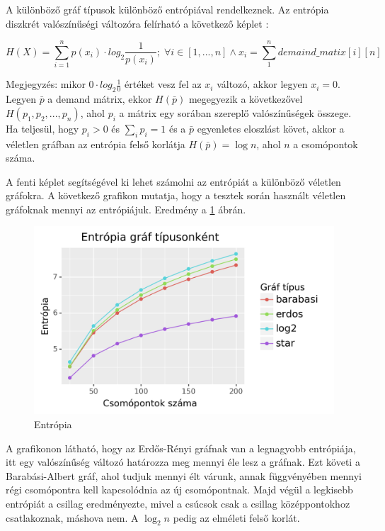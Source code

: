 \documentclass[12pt]{report}
\begin{document}
A különböző gráf típusok különböző entrópiával rendelkeznek.
Az entrópia diszkrét valószínűségi változóra felírható a következő képlet \cite{DBLP:journals/corr/AvinMS17}:  

\[H(X) = \sum_{i=1}^{n} p(x_i) \cdot log_2\frac{1}{p(x_i)}; \; \forall i\in[1, ..., n] \land x_i = \sum_{1}^{n} demaind\_matix[i][n]\] 

Megjegyzés: mikor \(0\cdot log_2\frac{1}{0}\) értéket vesz fel az \(x_i\) változó, akkor legyen \(x_i=0\). 
Legyen \(\bar{p}\) a demand mátrix, ekkor \(H(\bar{p})\) megegyezik a következővel \(H(p_1, p_2, ..., p_n)\), ahol \(p_i\) a mátrix egy sorában szereplő valószínűségek összege.
Ha teljesül, hogy \(p_i > 0\) és $\sum_{i}p_i = 1$ és a \(\bar{p}\) egyenletes eloszlást követ, akkor a véletlen gráfban az entrópia felső korlátja \(H(\bar{p}) = \log n\), ahol $n$ a csomópontok száma.

A fenti képlet segítségével ki lehet számolni az entrópiát a különböző véletlen gráfokra.
A következő grafikon mutatja, hogy a tesztek során használt véletlen gráfoknak mennyi az entrópiájuk.
Eredmény a \ref{entropy} ábrán.

\begin{figure}[H]
	\begin{center}
		\includegraphics[width=0.9\linewidth]{pictures/entropy.png}
		\caption{Entrópia}
		\label{entropy}
	\end{center}
\end{figure}

A grafikonon látható, hogy az Erdős-Rényi gráfnak van a legnagyobb entrópiája, itt egy valószínűség változó határozza meg mennyi éle lesz a gráfnak.
Ezt követi a Barabási-Albert gráf, ahol tudjuk mennyi élt várunk, annak függvényében mennyi régi csomópontra kell kapcsolódnia az új csomópontnak.
Majd végül a legkisebb entrópiát a csillag eredményezte, mivel a csúcsok csak a csillag középpontokhoz csatlakoznak, máshova nem.
A $\log_2n$ pedig az elméleti felső korlát.
\end{document}

